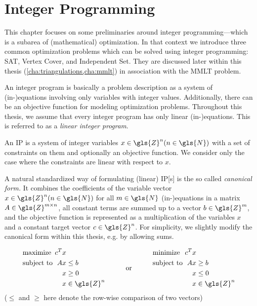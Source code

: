 \chapter{Integer Programming}
\label{cha:integer_programming}
This chapter focuses on some preliminaries around integer
programming---which is a subarea of (mathematical) optimization.
In that context we introduce three common optimization problems which
can be solved using integer programming: SAT, Vertex Cover, and
Independent Set. They are discussed later within this thesis
(\cref{cha:triangulations,cha:mmlt}) in association with the
\gls{MMLT} problem.

An integer program is basically a problem description as a system
of (in-)equations involving only variables with integer values.
Additionally, there can be an objective function for modeling
optimization problems. Throughout this thesis, we assume that every
integer program has only linear (in-)equations. This is referred to as
a \emph{linear integer program}.

\begin{definition}
  An \gls{IP} is a system of integer variables
  \(x \in \gls{Z}^n (n \in \gls{N})\)
  with a set of constraints on them
  and optionally an objective function. 
  We consider only the case
  where the constraints are linear with respect to \(x\).
\end{definition}

A natural standardized way of formulating (linear) \gls{IP}[s] is the 
so called \emph{canonical form.} It combines the coefficients of the
variable vector \(x \in \gls{Z}^n (n \in \gls{N})\)
for all \(m \in \gls{N}\) (in-)equations
in a matrix \(A \in \gls{Z}^{m \times n}\), 
all constant terms are
summed up to a vector \(b \in \gls{Z}^m\), and the objective function is represented
as a multiplication of the variables \(x\) and a constant target
vector \(c \in \gls{Z}^n\). For simplicity, we slightly modify the canonical form
within this thesis, e.g. by allowing sums.

\begin{problem}
  \[
  \begin{array}{lll}
    \begin{alignedat}{2}
      &\text{maximize } & c^Tx \\
      &\text{subject to } & Ax &\leq b \\
      && x &\geq 0 \\
      && x &\in \gls{Z}^n
    \end{alignedat}
    & \text{\hspace{2em}or\hspace{2em}} &
    \begin{alignedat}{2}
      &\text{minimize } & c^Tx \\
      &\text{subject to } & Ax &\geq b \\
      && x &\leq 0 \\
      && x &\in \gls{Z}^n
    \end{alignedat}
  \end{array}
  \]
  (\(\leq\) and \(\geq\) here denote the row-wise comparison
  of two vectors)
\end{problem}

